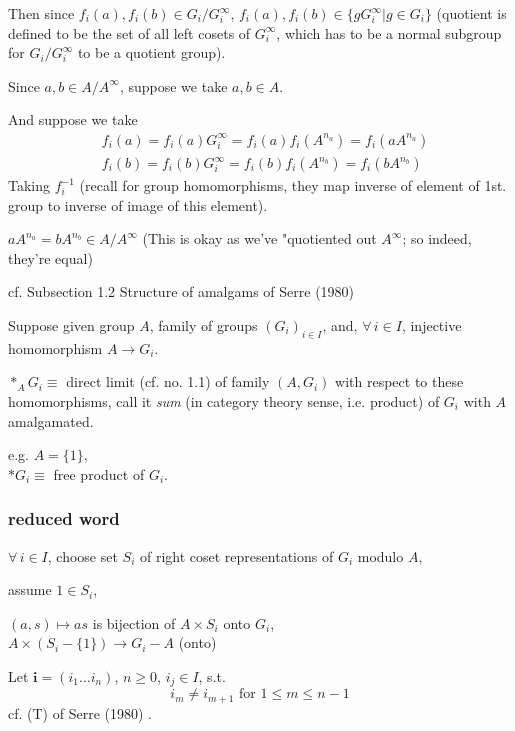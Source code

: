\documentclass[10pt]{amsart}
\begin{document}
\begin{multicols*}{2}
Then since $f_i(a),f_i(b) \in G_i/G_i^{\infty}$, $f_i(a),f_i(b) \in \lbrace gG_i^{\infty} | g\in G_i \rbrace$ (quotient is defined to be the set of all left cosets of $G_i^{\infty}$, which has to be a normal subgroup for $G_i/G_i^{\infty}$ to be a quotient group).  

Since $a,b \in A/A^{\infty}$, suppose we take $a,b\in A$.  

And suppose we take 
\[
\begin{aligned}
& 	f_i(a) = f_i(a)G_i^{\infty} = f_i(a) f_i(A^{n_a} ) = f_i(aA^{n_a}) \\ 
& 	f_i(b) = f_i(b)G_i^{\infty} = f_i(b) f_i(A^{n_b} ) = f_i(bA^{n_b})  
\end{aligned}
\]
Taking $f_i^{-1}$ (recall for group homomorphisms, they map inverse of element of 1st. group to inverse of image of this element).  

$aA^{n_a}=bA^{n_b}\in A/A^{\infty}$ (This is okay as we've "quotiented out $A^{\infty}$; so indeed, they're equal)


cf. Subsection 1.2 Structure of amalgams of Serre (1980) \cite{Serr1980} 

Suppose given group $A$, family of groups $(G_i)_{i\in I}$, and, $\forall \, i\in I$, injective homomorphism $A\to G_i$.  

$*_A G_i \equiv $ direct limit (cf. no. 1.1) of family $(A,G_i)$ with respect to these homomorphisms, call it \emph{sum} (in category theory sense, i.e. product) of $G_i$ with $A$ amalgamated.  

e.g. $A=\lbrace 1 \rbrace$, \\
$*G_i \equiv $ free product of $G_i$.  

\subsubsection{reduced word}  

$\forall \, i \in I$, choose set $S_i$ of right coset representations of $G_i$ modulo $A$, 

assume $1 \in S_i$, 

$(a,s)\mapsto as$ is bijection of $A\times S_i$ onto $G_i$,  \\
$A\times (S_i-\lbrace 1 \rbrace) \to G_i-A$ (onto)

Let $\mathbf{i} = (i_1\dots i_n)$, $n\geq 0$, $i_j \in I$, s.t. 
\begin{equation}
i_m \neq i_{m+1} \text{ for } 1 \leq m \leq n-1
\end{equation}
cf. (T) of Serre (1980) \cite{Serr1980}.  


\end{multicols*}
\end{document}

